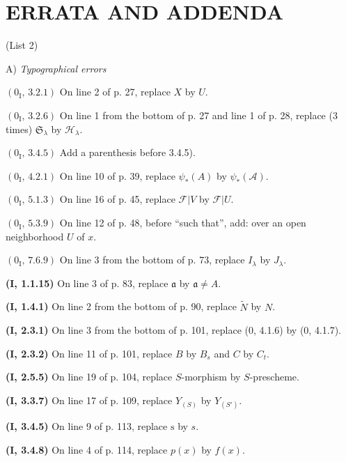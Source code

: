 \documentclass[10pt,oneside]{book}
\newcommand{\sh}[1]{\mathscr{#1}}
\newcommand{\oldpage}[2][]{\setcounter{footnote}{0}\marginpar{\scriptsize\textbf{#1}~|~#2}\ignorespaces}
\begin{document}
\clearpage
\thispagestyle{empty}
\null
\clearpage

\oldpage[III]{217}
\section*{ERRATA AND ADDENDA}
\begin{center}
(List 2)

\medskip
A) \emph{Typographical errors}
\end{center}

\noindent\textbf{$(0_{\mathrm I},\,3.2.1)$} On line 2 of p. 27, replace $X$
by $U$.

\noindent\textbf{$(0_{\mathrm I},\,3.2.6)$} On line 1 from the bottom of p.
27 and line 1 of p. 28, replace (3 times) $\mathfrak S_\lambda$ by
$\sh{H}_\lambda$.

\noindent\textbf{$(0_{\mathrm I},\,3.4.5)$} Add a parenthesis before 3.4.5).

\noindent\textbf{$(0_{\mathrm I},\,4.2.1)$} On line 10 of p. 39, replace
$\psi_*(A)$ by $\psi_*(\sh{A})$.

\noindent\textbf{$(0_{\mathrm I},\,5.1.3)$} On line 16 of p. 45, replace
$\sh{F}|V$ by $\sh{F}|U$.

\noindent\textbf{$(0_{\mathrm I},\,5.3.9)$} On line 12 of p. 48, before
``such that'', add: over an open neighborhood $U$ of $x$.

\noindent\textbf{$(0_{\mathrm I},\,7.6.9)$} On line 3 from the bottom of p.
73, replace $I_\lambda$ by $J_\lambda$.

\noindent\textbf{(I, 1.1.15)} On line 3 of p. 83, replace $\mathfrak a$ by
$\mathfrak a\ne A$.

\noindent\textbf{(I, 1.4.1)} On line 2 from the bottom of p. 90, replace
$\widetilde N$ by $N$.

\noindent\textbf{(I, 2.3.1)} On line 3 from the bottom of p. 101, replace (0,
4.1.6) by (0, 4.1.7).

\noindent\textbf{(I, 2.3.2)} On line 11 of p. 101, replace $B$ by $B_s$ and
$C$ by $C_t$.

\noindent\textbf{(I, 2.5.5)} On line 19 of p. 104, replace $S$-morphism by
$S$-prescheme.

\noindent\textbf{(I, 3.3.7)} On line 17 of p. 109, replace $Y_{(S)}$ by
$Y_{(S')}$.

\noindent\textbf{(I, 3.4.5)} On line 9 of p. 113, replace $\mathrm s$ by $s$.

\noindent\textbf{(I, 3.4.8)} On line 4 of p. 114, replace $p(x)$ by $f(x)$.
\end{document}
